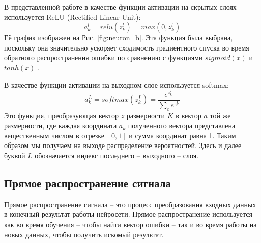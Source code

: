 \documentclass[a4paper,12pt]{article}
\theoremstyle{remark}
\begin{document}
	В представленной работе в качестве функции активации на скрытых слоях используется ReLU (Rectified Linear Unit):
	\begin{equation}
		a_k^l = relu(z_k^l) = max(0,z_k^l)
	\end{equation}
	Её график изображен на Рис. \ref{fig:neuron_b}. Эта функция была выбрана, поскольку она значительно ускоряет сходимость градиентного спуска во время обратного распространения ошибки по сравнению с функциями $sigmoid(x)$ и $tanh(x)$ \cite{imagenet_classification}.
	
	В качестве функции активации на выходном слое используется  softmax:
	\begin{equation}\label{eq:softmax}
		a_k^L = softmax(z_k^L) = \frac{e^{z_k^L}}{\sum_{c} e^{z_c^L}}
	\end{equation}
	Это функция, преобразующая вектор $z$ размерности $K$ в вектор $a$ той же размерности, где каждая координата $a_k$ полученного вектора представлена вещественным числом в отрезке $[0, 1]$ и сумма координат равна 1. Таким образом мы получаем на выходе распределение вероятностей. Здесь и далее буквой $L$ обозначается индекс последнего -- выходного -- слоя.
	
	\subsection{Прямое распространение сигнала}
	
	Прямое распространение сигнала -- это процесс преобразования входных данных в конечный результат работы нейросети. Прямое распространение используется как во время обучения -- чтобы найти вектор ошибки -- так и во время работы на новых данных, чтобы получить искомый результат.
	
\end{document}
